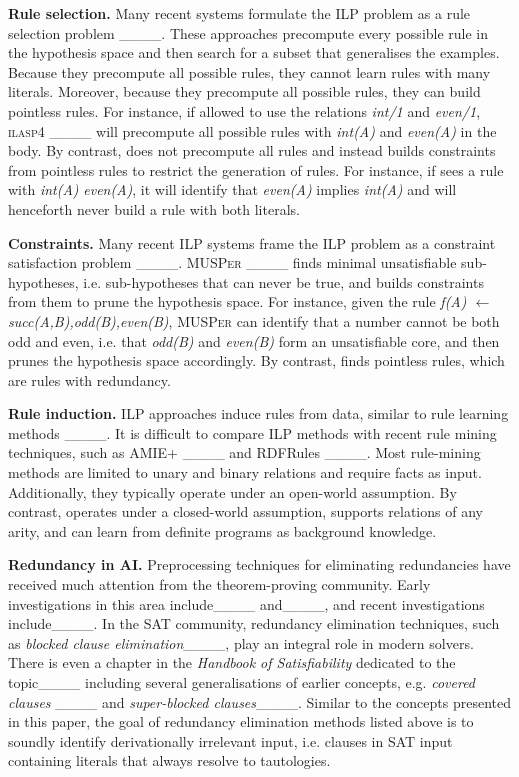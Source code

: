 \textbf{Rule selection.}
Many recent systems formulate the ILP problem as a rule selection problem ____.
These approaches precompute every possible rule in the hypothesis space and then search for a subset that generalises the examples.
Because they precompute all possible rules, they cannot learn rules with many literals.
Moreover, because they precompute all possible rules, they can build pointless rules. 
For instance, if allowed to use the relations \emph{int/1} and \emph{even/1}, \textsc{ilasp4} ____ will precompute all possible rules with \emph{int(A)} and \emph{even(A)} in the body.
By contrast, \name{} does not precompute all rules and instead builds constraints from pointless rules to restrict the generation of rules. 
For instance, if \name{} sees a rule with \emph{int(A)} \emph{even(A)}, it will identify that \emph{even(A)} implies \emph{int(A)} and will henceforth never build a rule with both literals. 





\textbf{Constraints.}
Many recent ILP systems frame the ILP problem as a constraint satisfaction problem ____.
\textsc{MUSPer} ____ finds minimal unsatisfiable sub-hypotheses, i.e. sub-hypotheses that can never be true, and builds constraints from them to prune the hypothesis space.
For instance, given the rule 
\emph{f(A) $\leftarrow$ succ(A,B),odd(B),even(B)},
\textsc{MUSPer} can identify that a number cannot be both odd and even, i.e. that \emph{odd(B)} and \emph{even(B)} form an unsatisfiable core, and then prunes the hypothesis space accordingly.
By contrast, \name{} finds pointless rules, which are rules with redundancy.

\textbf{Rule induction.}
ILP approaches induce rules from data, similar to rule learning methods ____.
It is difficult to compare ILP methods with recent rule mining techniques, such as AMIE+ ____ and RDFRules ____.
Most rule-mining methods are limited to unary and binary relations and require facts as input. Additionally, they typically operate under an open-world assumption. 
By contrast, \name{} operates under a closed-world assumption, supports relations of any arity, and can learn from definite programs as background knowledge.

\textbf{Redundancy in AI.}
Preprocessing techniques for eliminating redundancies have received much attention from the theorem-proving community.  Early investigations in this area include____ and____, and recent investigations include____. 
In the SAT community, redundancy elimination techniques, such as \emph{blocked clause elimination}____, play an integral role in modern solvers. There is even a chapter in the \emph{Handbook of Satisfiability} dedicated to the topic____ including several generalisations of earlier concepts, e.g. \emph{covered clauses} ____ and \emph{super-blocked clauses}____. Similar to the concepts presented in this paper, the goal of redundancy elimination methods listed above is to soundly identify derivationally irrelevant input, i.e. clauses in SAT input containing literals that always resolve to tautologies.